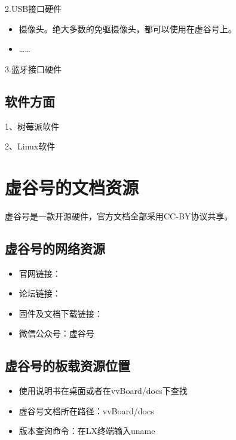 \documentclass[letterpaper,10pt,english]{sphinxmanual}
\begin{document}
2.USB接口硬件
\begin{itemize}
\item {} 
摄像头。绝大多数的免驱摄像头，都可以使用在虚谷号上。

\item {} 
……

\end{itemize}

3.蓝牙接口硬件


\subsection{软件方面}
\label{\detokenize{01.about/1.4-ecology:id3}}
1、树莓派软件

2、Linux软件


\section{虚谷号的文档资源}
\label{\detokenize{01.about/1.5-docs::doc}}\label{\detokenize{01.about/1.5-docs:id1}}
虚谷号是一款开源硬件，官方文档全部采用CC-BY协议共享。


\subsection{虚谷号的网络资源}
\label{\detokenize{01.about/1.5-docs:id2}}\begin{itemize}
\item {} 
官网链接：

\item {} 
论坛链接：

\item {} 
固件及文档下载链接：

\item {} 
微信公众号：虚谷号

\end{itemize}


\subsection{虚谷号的板载资源位置}
\label{\detokenize{01.about/1.5-docs:id3}}\begin{itemize}
\item {} 
使用说明书在桌面或者在vvBoard/docs下查找

\item {} 
虚谷号文档所在路径：vvBoard/docs

\item {} 
版本查询命令：在LX终端输入uname

\end{itemize}
\end{document}
